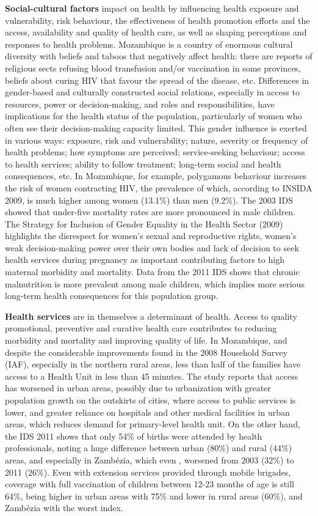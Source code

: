 \documentclass[
]{book}
\begin{document}
\textbf{Social-cultural factors} impact on health by influencing health exposure and vulnerability, risk behaviour, the effectiveness of health promotion efforts and the access, availability and quality of health care, as well as shaping perceptions and responses to health problems. Mozambique is a country of enormous cultural diversity with beliefs and taboos that negatively affect health: there are reports of religious sects refusing blood transfusion and/or vaccination in some provinces, beliefs about curing HIV that favour the spread of the disease, etc. Differences in gender-based and culturally constructed social relations, especially in access to resources, power or decision-making, and roles and responsibilities, have implications for the health status of the population, particularly of women who often see their decision-making capacity limited. This gender influence is exerted in various ways: exposure, risk and vulnerability; nature, severity or frequency of health problems; how symptoms are perceived; service-seeking behaviour; access to health services; ability to follow treatment; long-term social and health consequences, etc. In Mozambique, for example, polygamous behaviour increases the risk of women contracting HIV, the prevalence of which, according to INSIDA 2009, is much higher among women (13.1\%) than men (9.2\%). The 2003 IDS showed that under-five mortality rates are more pronounced in male children. The Strategy for Inclusion of Gender Equality in the Health Sector (2009) highlights the disrespect for women's sexual and reproductive rights, women's weak decision-making power over their own bodies and lack of decision to seek health services during pregnancy as important contributing factors to high maternal morbidity and mortality. Data from the 2011 IDS shows that chronic malnutrition is more prevalent among male children, which implies more serious long-term health consequences for this population group.

\textbf{Health services} are in themselves a determinant of health. Access to quality promotional, preventive and curative health care contributes to reducing morbidity and mortality and improving quality of life. In Mozambique, and despite the considerable improvements found in the 2008 Household Survey (IAF), especially in the northern rural areas, less than half of the families have access to a Health Unit in less than 45 minutes. The study reports that access has worsened in urban areas, possibly due to urbanization with greater population growth on the outskirts of cities, where access to public services is lower, and greater reliance on hospitals and other medical facilities in urban areas, which reduces demand for primary-level health unit. On the other hand, the IDS 2011 shows that only 54\% of births were attended by health professionals, noting a huge difference between urban (80\%) and rural (44\%) areas, and especially in Zambézia, which even , worsened from 2003 (32\%) to 2011 (26\%). Even with extension services provided through mobile brigades, coverage with full vaccination of children between 12-23 months of age is still 64\%, being higher in urban areas with 75\% and lower in rural areas (60\%), and Zambézia with the worst index.
\end{document}

